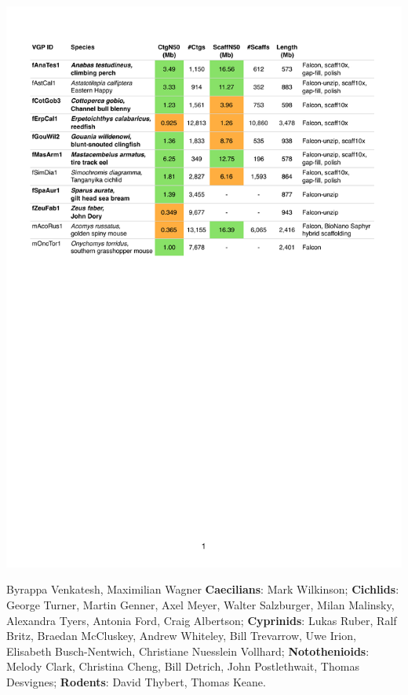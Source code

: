 \documentclass[a0,portrait]{a0poster}
\begin{document}
\begin{multicols}{2}
\begin{center}
\captionsetup{type=table}
\includegraphics[width=1.0\linewidth]{images/table.pdf}
\end{center}

\hfill

\noindent{\textbf{\textcolor{sangertext}{Acknowledgements:}}} {} \small{Byrappa Venkatesh, Maximilian Wagner \textbf{Caecilians}: Mark Wilkinson; \textbf{Cichlids}: George Turner, Martin Genner, Axel Meyer, Walter Salzburger, Milan Malinsky, Alexandra Tyers, Antonia Ford, Craig Albertson; \textbf{Cyprinids}: Lukas Ruber, Ralf Britz, Braedan McCluskey, Andrew Whiteley, Bill Trevarrow, Uwe Irion, Elisabeth Busch-Nentwich, Christiane Nuesslein Vollhard; \textbf{Notothenioids}: Melody Clark, Christina Cheng, Bill Detrich, John Postlethwait, Thomas Desvignes; \textbf{Rodents}: David Thybert, Thomas Keane.}


\end{multicols}
\end{document}
